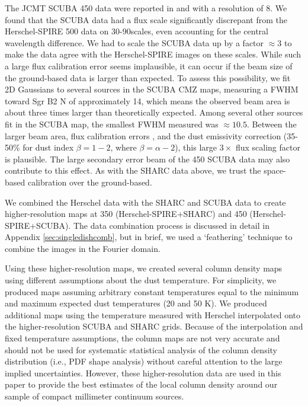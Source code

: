 \documentclass[twocolumn]{aastex61}
\newcommand{\percent}{\%\xspace}
\begin{document}
The JCMT SCUBA 450 \um data were reported in \citet{Pierce-Price2000a} and
\citet{di-Francesco2008a} with a resolution of 8\arcsec.  We found that the
SCUBA data had a flux scale significantly discrepant from the Herschel-SPIRE
500 \um data on 30-90\arcsec scales, even accounting for the central wavelength
difference.  We had to
scale the SCUBA data up by a factor $\approx3$ to make the data agree with
the Herschel-SPIRE images on these scales.  While such a large flux calibration
error seems implausible, it can occur if the beam size of the ground-based data
is larger than expected.  To assess this possibility, we fit 2D Gaussians to
several sources in the SCUBA CMZ maps, measuring a FWHM toward Sgr B2 N of
approximately 14\arcsec, which means the observed beam area is about three times larger
than theoretically expected.  Among several other sources fit in the
SCUBA map, the smallest FWHM measured was $\approx10.5$\arcsec.  Between the
larger beam area, flux
calibration errors \citep[quoted at 20\percent in][]{Pierce-Price2000a}, and
the dust emissivity correction (35-50\percent for dust index $\beta=1-2$, where
$\beta=\alpha-2$), this large $3\times$ flux
scaling factor is plausible.  The large secondary error beam
\citep[17.3\arcsec][]{di-Francesco2008a} of the 450 \um SCUBA data may also
contribute to this effect.  As with the SHARC data above, we trust the
space-based calibration over the ground-based.


We combined the Herschel data with the SHARC and SCUBA data to create
higher-resolution maps at 350 \um (Herschel-SPIRE+SHARC) and 450 \um
(Herschel-SPIRE+SCUBA).  The data combination process is discussed in detail in
Appendix \ref{sec:singledishcomb}, but in brief, we used a `feathering'
technique \citep[e.g.,][]{Stanimirovic2002a,Cotton2017a} to combine the images
in the Fourier domain.


Using these higher-resolution maps, we created several column density maps
using different assumptions about the dust temperature.  For simplicity, we
produced maps assuming arbitrary constant temperatures equal to the minimum and
maximum expected dust temperatures (20 and 50 K). We produced additional maps
using the temperature measured with Herschel interpolated onto the
higher-resolution SCUBA and SHARC grids.  Because of the interpolation and
fixed temperature assumptions, the column maps are not very accurate and should
not be used for systematic statistical analysis of the column density
distribution (i.e., PDF shape analysis) without careful attention to the large
implied uncertainties.  However, these higher-resolution data are used in this
paper to provide the best estimates of the local column density around our
sample of compact millimeter continuum sources.
\end{document}
